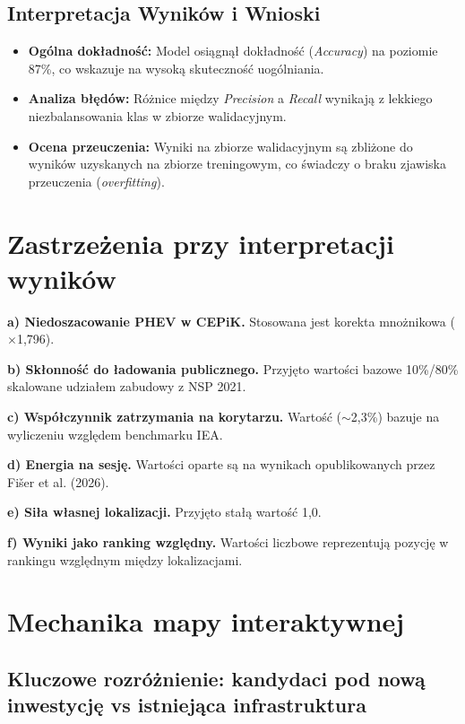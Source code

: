 \documentclass[11pt,a4paper]{article}
\begin{document}
	\subsection{Interpretacja Wyników i Wnioski}
	\begin{itemize}
		\item \textbf{Ogólna dokładność:} Model osiągnął dokładność (\textit{Accuracy}) na poziomie 87\%, co wskazuje na wysoką skuteczność uogólniania.
		\item \textbf{Analiza błędów:} Różnice między \textit{Precision} a \textit{Recall} wynikają z lekkiego niezbalansowania klas w zbiorze walidacyjnym.
		\item \textbf{Ocena przeuczenia:} Wyniki na zbiorze walidacyjnym są zbliżone do wyników uzyskanych na zbiorze treningowym, co świadczy o braku zjawiska przeuczenia (\textit{overfitting}).
	\end{itemize}
	\section{Zastrzeżenia przy interpretacji wyników}
	
	\textbf{a) Niedoszacowanie PHEV w CEPiK.} Stosowana jest korekta mnożnikowa ($\times$1,796).
	
	\textbf{b) Skłonność do ładowania publicznego.} Przyjęto wartości bazowe 10\%/80\% skalowane udziałem zabudowy z NSP 2021.
	
	\textbf{c) Współczynnik zatrzymania na korytarzu.} Wartość ($\sim$2,3\%) bazuje na wyliczeniu względem benchmarku IEA.
	
	\textbf{d) Energia na sesję.} Wartości oparte są na wynikach opublikowanych przez Fišer et al. (2026).
	
	\textbf{e) Siła własnej lokalizacji.} Przyjęto stałą wartość 1,0.
	
	\textbf{f) Wyniki jako ranking względny.} Wartości liczbowe reprezentują pozycję w rankingu względnym między lokalizacjami.
	
	\newpage
	\section{Mechanika mapy interaktywnej}
	
	\subsection{Kluczowe rozróżnienie: kandydaci pod nową inwestycję vs istniejąca infrastruktura}
	
\end{document}
